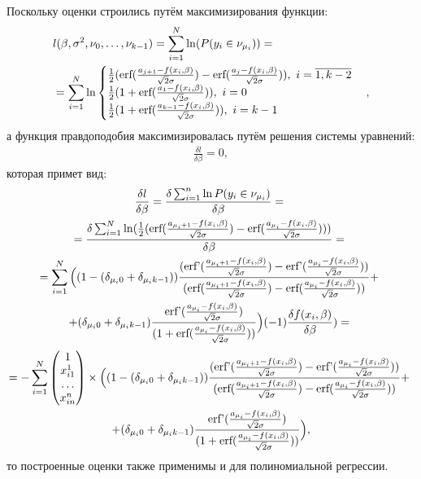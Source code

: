Поскольку оценки строились путём максимизирования функции:
\begin{eqnarray}
    &l(\beta,\sigma^2, \nu_0,\dots, \nu_{k-1})=\sum_{i=1}^{N}\ln(P(y_i\in \nu_{\mu_i}))=\\
    &=\sum\limits_{i=1}^{N}\ln\begin{cases}
        \frac{1}{2}(\textup{erf}(\frac{a_{j+1}-f(x_i,\beta)}{\sqrt{2}\sigma})-\textup{erf}(\frac{a_{j}-f(x_i,\beta)}{\sqrt{2}\sigma})),~i=\overline{1,k-2}\\
        \frac{1}{2}(1+\textup{erf}(\frac{a_{1}-f(x_i,\beta)}{\sqrt{2}\sigma})),~i=0\\
        \frac{1}{2}(1+\textup{erf}(\frac{a_{k-1}-f(x_i,\beta)}{\sqrt{2}\sigma})),~i=k-1
    \end{cases},
\end{eqnarray}
а функция правдоподобия максимизировалась путём решения системы уравнений:
\begin{eqnarray}
    \frac{\delta l}{\delta \beta}=0,
\end{eqnarray}
которая примет вид:
\begin{multline}
    \frac{\delta l}{\delta \beta}=\frac{\delta \sum_{i=1}^{n}\ln P(y_i\in \nu_{\mu_i})}{\delta \beta}=~\\
    =\frac{\delta \sum_{i=1}^{N} \ln(\frac{1}{2}(\textup{erf}(\frac{a_{\mu_i+1}-f(x_i,\beta)}{\sqrt{2}\sigma})-\textup{erf}(\frac{a_{\mu_i}-f(x_i,\beta)}{\sqrt{2}\sigma})) )         }{\delta \beta}=~\\
    =  \sum_{i=1}^{N}\Big((1-(\delta_{\mu_i 0}+\delta_{\mu_i k-1}))\frac{(\textup{erf'}(\frac{a_{\mu_i+1}-f(x_i,\beta)}{\sqrt{2}\sigma})-\textup{erf'}(\frac{a_{\mu_i}-f(x_i,\beta)}{\sqrt{2}\sigma}))}{ (\textup{erf}(\frac{a_{\mu_i+1}-f(x_i,\beta)}{\sqrt{2}\sigma})-\textup{erf}(\frac{a_{\mu_i}-f(x_i,\beta)}{\sqrt{2}\sigma}))}+~\\
    +(\delta_{\mu_i 0}+\delta_{\mu_i k-1})\frac{\textup{erf'}(\frac{a_{\mu_i}-f(x_i,\beta)}{\sqrt{2}\sigma})}{(1+\textup{erf}(\frac{a_{\mu_i}-f(x_i,\beta)}{\sqrt{2}\sigma}))}\Big)  (-1) \frac{\delta f(x_i,\beta)}{\delta \beta} )=~
\end{multline}
\begin{multline}
    \nonumber 
    =-\sum_{i=1}^{N}\begin{pmatrix}
        1\\
        x_{i1}^1\\
        \dots\\
        x_{in}^n
    \end{pmatrix}\times  \Big((1-(\delta_{\mu_i 0}+\delta_{\mu_i k-1}))\frac{(\textup{erf'}(\frac{a_{\mu_i+1}-f(x_i,\beta)}{\sqrt{2}\sigma})-\textup{erf'}(\frac{a_{\mu_i}-f(x_i,\beta)}{\sqrt{2}\sigma}))}{ (\textup{erf}(\frac{a_{\mu_i+1}-f(x_i,\beta)}{\sqrt{2}\sigma})-\textup{erf}(\frac{a_{\mu_i}-f(x_i,\beta)}{\sqrt{2}\sigma}))}+~\\
    +(\delta_{\mu_i 0}+\delta_{\mu_i k-1})\frac{\textup{erf'}(\frac{a_{\mu_i}-f(x_i,\beta)}{\sqrt{2}\sigma})}{(1+\textup{erf}(\frac{a_{\mu_i}-f(x_i,\beta)}{\sqrt{2}\sigma}))}\Big),
\end{multline}
то построенные оценки также применимы и для полиномиальной регрессии.

